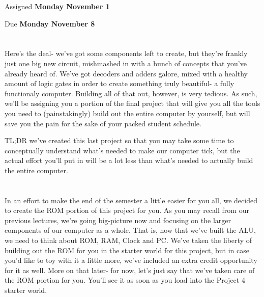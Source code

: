 \documentclass{article}
\begin{document}
\large

{\selectfont{\Huge CMSC389E Project 4: \par Clock \& Program Counter}}

Assigned \textbf{Monday November 1}

Due \textbf{Monday November 8}

\section{\selectfont{Project At a Glance}}

Here's the deal- we've got some components left to create, but they're frankly just one big new circuit, mishmashed in with a bunch of concepts that you've already heard of.
We've got decoders and adders galore, mixed with a healthy amount of logic gates in order to create something truly beautiful- a fully functionaly computer.
Building all of that out, however, is very tedious.
As such, we'll be assigning you a portion of the final project that will give you all the tools you need to (painstakingly) build out the entire computer by yourself, but will save you the pain for the sake of your packed student schedule.

TL;DR we've created this last project so that you may take some time to conceptually understand what's needed to make our computer tick, but the actual effort you'll put in will be a lot less than what's needed to actually build the entire computer.

\section{\selectfont{Drake, where's the ROM?}}

In an effort to make the end of the semester a little easier for you all, we decided to create the ROM portion of this project for you. 
As you may recall from our previous lectures, we're going big-picture now and focusing on the larger components of our computer as a whole.
That is, now that we've built the ALU, we need to think about ROM, RAM, Clock and PC. 
We've taken the liberty of building out the ROM for you in the starter world for this project, but in case you'd like to toy with it a little more, we've included an extra credit opportunity for it as well.
More on that later- for now, let's just say that we've taken care of the ROM portion for you.
You'll see it as soon as you load into the Project 4 starter world.
\end{document}
